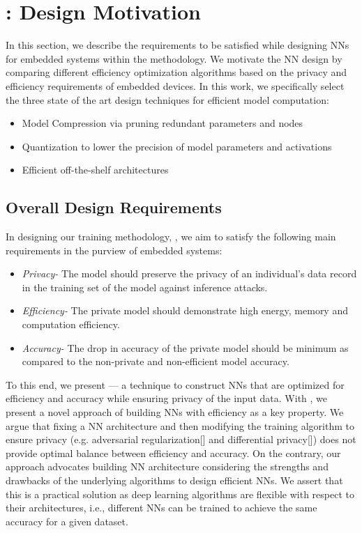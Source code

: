 \section{\method: Design Motivation}\label{motivate}

In this section, we describe the requirements to be satisfied while designing NNs for embedded systems within the \method\hspace{0.02in} methodology.
We motivate the NN design by comparing different efficiency optimization algorithms based on the privacy and efficiency requirements of embedded devices.
In this work, we specifically select the three state of the art design techniques for efficient model computation:
\begin{itemize}
\item Model Compression via pruning redundant parameters and nodes
\item Quantization to lower the precision of model parameters and activations
\item Efficient off-the-shelf architectures
\end{itemize}


\subsection{Overall Design Requirements}

In designing our training methodology, \method, we aim to satisfy the following main requirements in the purview of embedded systems:

\begin{itemize}[leftmargin=*]

\item {\em Privacy-}
The model should preserve the privacy of an individual's data record in the training set of the model against inference attacks.

\item {\em Efficiency-}
The private model should demonstrate high energy, memory and computation efficiency.

\item {\em Accuracy-}
The drop in accuracy of the private model should be minimum as compared to the non-private and non-efficient model accuracy.
\end{itemize}

To this end, we present \method --- a technique to construct NNs that are optimized for efficiency and accuracy while ensuring privacy of the input data.
With \method, we present a novel approach of building NNs with efficiency as a key property.
We argue that fixing a NN architecture and then modifying the training algorithm to ensure privacy (e.g. adversarial regularization[] and differential privacy[]) does not provide optimal balance between efficiency and accuracy.
On the contrary, our approach advocates building NN architecture considering the strengths and drawbacks of the underlying algorithms to design efficient NNs.
We assert that this is a practical solution as deep learning algorithms are flexible with respect to their architectures, i.e., different NNs can be trained to achieve the same accuracy for a given dataset.


